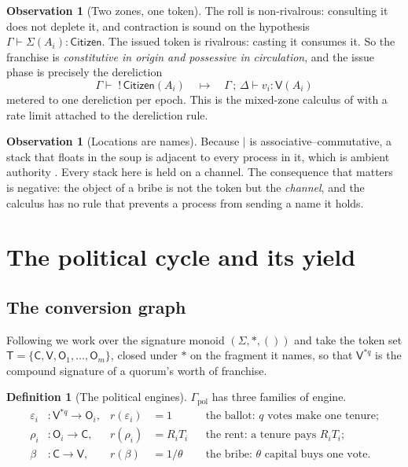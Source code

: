 \documentclass[11pt]{article}
\theoremstyle{plain}
\theoremstyle{definition}
\newtheorem{definition}[theorem]{Definition}
\newtheorem{observation}[theorem]{Observation}
\theoremstyle{remark}
\newcommand{\Tok}{\mathsf{T}}
\newcommand{\Sig}{\Sigma}
\newcommand{\Vt}{\mathsf{V}}
\newcommand{\Ct}{\mathsf{C}}
\newcommand{\Ot}{\mathsf{O}}
\newcommand{\Cit}{\mathsf{Citizen}}
\begin{document}
\begin{observation}[Two zones, one token]
The roll is non-rivalrous: consulting it does not deplete it, and contraction
is sound on the hypothesis $\Gamma \vdash \Sig(A_i) : \Cit$. The issued token is
rivalrous: casting it consumes it. So the franchise is \emph{constitutive in
origin and possessive in circulation}, and the issue phase is precisely the
dereliction
\[
  \Gamma \vdash\; !\,\Cit(A_i) \quad\longmapsto\quad \Gamma\,;\,\Delta \vdash v_i : \Vt(A_i)
\]
metered to one dereliction per epoch. This is the mixed-zone calculus of
\cite[\S6.3]{typedval} with a rate limit attached to the dereliction rule.
\end{observation}

\begin{observation}[Locations are names]
Because $\mid$ is associative--commutative, a stack that floats in the soup is
adjacent to every process in it, which is ambient authority
\cite[\S2.2]{finrho}. Every stack here is held on a channel. The consequence
that matters is negative: the object of a bribe is not the token but the
\emph{channel}, and the calculus has no rule that prevents a process from
sending a name it holds.
\end{observation}

\section{The political cycle and its yield}
\label{sec:cycle}

\subsection{The conversion graph}

Following \cite[\S2]{vtok} we work over the signature monoid $(\Sig,\ast,())$
and take the token set $\Tok = \{\Ct, \Vt, \Ot_1,\dots,\Ot_m\}$, closed under
$\ast$ on the fragment it names, so that $\Vt^{\ast q}$ is the compound
signature of a quorum's worth of franchise.

\begin{definition}[The political engines]
\label{def:engines}
$\Gamma_{\mathrm{pol}}$ has three families of engine.
\begin{align*}
  \varepsilon_i &: \Vt^{\ast q} \to \Ot_i, & r(\varepsilon_i) &= 1
    &&\text{the ballot: $q$ votes make one tenure;}\\
  \rho_i &: \Ot_i \to \Ct, & r(\rho_i) &= R_i T_i
    &&\text{the rent: a tenure pays $R_iT_i$;}\\
  \beta &: \Ct \to \Vt, & r(\beta) &= 1/\theta
    &&\text{the bribe: $\theta$ capital buys one vote.}
\end{align*}
\end{definition}
\end{document}
